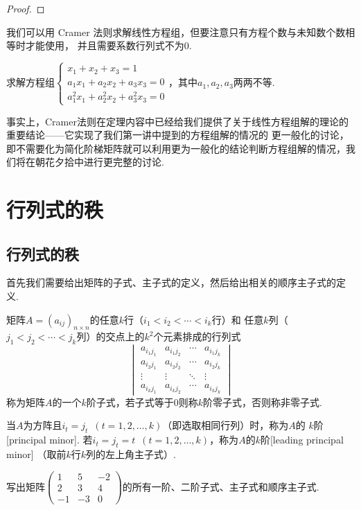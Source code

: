 \begin{proof}

\end{proof}

我们可以用 Cramer 法则求解线性方程组，但要注意只有方程个数与未知数个数相等时才能使用，
并且需要系数行列式不为0.
\begin{example}
    求解方程组$\begin{cases}
        x_1+x_2+x_3=1 \\
        a_1x_1+a_2x_2+a_3x_3=0 \\
        a_1^2x_1+a_2^2x_2+a_3^2x_3=0
    \end{cases}$，其中$a_1,a_2,a_3$两两不等.
\end{example}
\begin{solution}

\end{solution}

事实上，Cramer法则在定理内容中已经给我们提供了关于线性方程组解的理论的重要结论——它实现了我们第一讲中提到的方程组解的情况的
更一般化的讨论，即不需要化为简化阶梯矩阵就可以利用更为一般化的结论判断方程组解的情况，我们将在朝花夕拾中进行更完整的讨论.

\section{行列式的秩}
\subsection{行列式的秩}
首先我们需要给出矩阵的子式、主子式的定义，然后给出相关的顺序主子式的定义.
\begin{definition}
    矩阵$A=(a_{ij})_{n \times n}$的任意$k$行（$i_1<i_2<\cdots<i_k$行）和
    任意$k$列（$j_1<j_2<\cdots<j_k$列）的交点上的$k^2$个元素排成的行列式
    \[\begin{vmatrix}
        a_{i_1j_1} & a_{i_1j_2} & \cdots & a_{i_1j_k} \\
        a_{i_2j_1} & a_{i_2j_2} & \cdots & a_{i_2j_k} \\
        \vdots & \vdots & \ddots  & \vdots \\
        a_{i_kj_1} & a_{i_kj_2} & \cdots & a_{i_kj_k}
    \end{vmatrix}\]
    称为矩阵$A$的一个$k$阶子式，若子式等于0则称$k$阶零子式，否则称非零子式.

    当$A$为方阵且$i_t=j_t\enspace(t=1,2,\ldots,k)$（即选取相同行列）时，称为$A$的
    $k$阶[principal minor]. 若$i_t=j_t=t\enspace(t=1,2,\ldots,k)$，称为$A$的$k$阶[leading principal minor]
    （取前$k$行$k$列的左上角主子式）.
\end{definition}
\begin{example}
    写出矩阵$\begin{pmatrix}
        1 & 5 & -2 \\ 2 & 3 & 4 \\ -1 & -3 & 0
    \end{pmatrix}$的所有一阶、二阶子式、主子式和顺序主子式.
\end{example}

